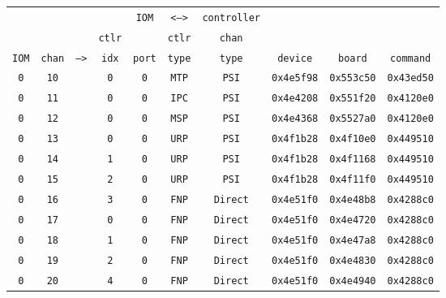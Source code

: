 \begin{adjustwidth}{5ex}{1ex}
	\begin{tabular}{cccccccccc}
		& & & & \texttt{IOM} & \texttt{<-->} & \texttt{controller} & & &  \\
		& & & \texttt{ctlr} & & \texttt{ctlr} & \texttt{chan} & & &  \\
		\texttt{IOM} & \texttt{chan} & \texttt{-->} & \texttt{idx} & \texttt{port} & \texttt{type} & \texttt{type} & \texttt{device} & \texttt{board} & \texttt{command} \\
		\texttt{0} & \texttt{10} & & \texttt{0} & \texttt{0} & \texttt {MTP} & \texttt{PSI} & \texttt{0x4e5f98} & \texttt{0x553c50} & \texttt{0x43ed50} \\
		\texttt{0} & \texttt{11} & & \texttt{0} & \texttt{0} & \texttt{IPC} & \texttt{PSI} & \texttt{0x4e4208} & \texttt{0x551f20} & \texttt{0x4120e0} \\
		\texttt{0} & \texttt{12} & & \texttt{0} & \texttt{0} & \texttt{MSP} & \texttt{PSI} & \texttt{0x4e4368} & \texttt{0x5527a0} & \texttt{0x4120e0} \\
		\texttt{0} & \texttt{13} & & \texttt{0} & \texttt{0} & \texttt{URP} & \texttt{PSI} & \texttt{0x4f1b28} & \texttt{0x4f10e0} & \texttt{0x449510} \\
		\texttt{0} & \texttt{14} & & \texttt{1} & \texttt{0} & \texttt{URP} & \texttt{PSI} & \texttt{0x4f1b28} & \texttt{0x4f1168} & \texttt{0x449510} \\
		\texttt{0} & \texttt{15} & & \texttt{2} & \texttt{0} & \texttt{URP} & \texttt{PSI} & \texttt{0x4f1b28} & \texttt{0x4f11f0} & \texttt{0x449510} \\
		\texttt{0} & \texttt{16} & & \texttt{3} & \texttt{0} & \texttt{FNP} & \texttt{Direct} & \texttt{0x4e51f0} & \texttt{0x4e48b8} & \texttt{0x4288c0} \\
		\texttt{0} & \texttt{17} & & \texttt{0} & \texttt{0} & \texttt{FNP} & \texttt{Direct} & \texttt{0x4e51f0} & \texttt{0x4e4720} & \texttt{0x4288c0} \\
		\texttt{0} & \texttt{18} & & \texttt{1} & \texttt{0} & \texttt{FNP} & \texttt{Direct} & \texttt{0x4e51f0} & \texttt{0x4e47a8} & \texttt{0x4288c0} \\
		\texttt{0} & \texttt{19} & & \texttt{2} & \texttt{0} & \texttt{FNP} & \texttt{Direct} & \texttt{0x4e51f0} & \texttt{0x4e4830} & \texttt{0x4288c0} \\
		\texttt{0} & \texttt{20} & & \texttt{4} & \texttt{0} & \texttt{FNP} & \texttt{Direct} & \texttt{0x4e51f0} & \texttt{0x4e4940} & \texttt{0x4288c0} \\

\end{tabular}
\end{adjustwidth}

